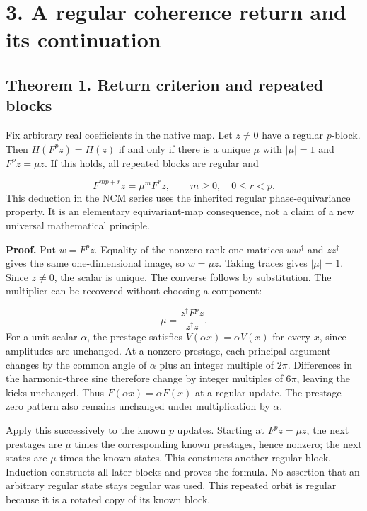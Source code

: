 \documentclass[11pt,a4paper]{article}
\begin{document}
\clearpage
\section*{3. A regular coherence return and its continuation}
\subsection*{Theorem 1. Return criterion and repeated blocks}
Fix arbitrary real coefficients in the native map. Let $z\neq0$ have a regular $p$-block. Then $H(F^p z)=H(z)$ if and only if there is a unique $\mu$ with $|\mu|=1$ and $F^p z=\mu z$. If this holds, all repeated blocks are regular and

\begin{equation}F^{mp+r}z=\mu^m F^r z,\qquad m\geq0,\quad 0\leq r<p.\end{equation}
This deduction in the NCM series uses the inherited regular phase-equivariance property. It is an elementary equivariant-map consequence, not a claim of a new universal mathematical principle. \cite{D02} \cite{OBS}

\textbf{Proof.} Put $w=F^p z$. Equality of the nonzero rank-one matrices $ww^\dagger$ and $zz^\dagger$ gives the same one-dimensional image, so $w=\mu z$. Taking traces gives $|\mu|=1$. Since $z\neq0$, the scalar is unique. The converse follows by substitution. The multiplier can be recovered without choosing a component:

\begin{equation}\mu=\frac{z^\dagger F^p z}{z^\dagger z}.\end{equation}
For a unit scalar $\alpha$, the prestage satisfies $V(\alpha x)=\alpha V(x)$ for every $x$, since amplitudes are unchanged. At a nonzero prestage, each principal argument changes by the common angle of $\alpha$ plus an integer multiple of $2\pi$. Differences in the harmonic-three sine therefore change by integer multiples of $6\pi$, leaving the kicks unchanged. Thus $F(\alpha x)=\alpha F(x)$ at a regular update. The prestage zero pattern also remains unchanged under multiplication by $\alpha$.

Apply this successively to the known $p$ updates. Starting at $F^p z=\mu z$, the next prestages are $\mu$ times the corresponding known prestages, hence nonzero; the next states are $\mu$ times the known states. This constructs another regular block. Induction constructs all later blocks and proves the formula. No assertion that an arbitrary regular state stays regular was used. This repeated orbit is regular because it is a rotated copy of its known block.
\end{document}
